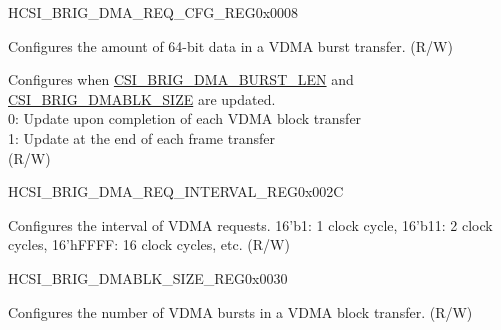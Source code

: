 \begin{register}{H}{CSI\_BRIG\_DMA\_REQ\_CFG\_REG}{0x0008}\label{regdesc:CSIBRIGDMAREQCFGREG}
%
%
%
\regnewline%
\begin{regdesc}\begin{reglist}
\label{fielddesc:CSIBRIGDMABURSTLEN}\item [CSI\_BRIG\_DMA\_BURST\_LEN] Configures the amount of 64-bit data in a VDMA burst transfer. (R/W)
\label{fielddesc:CSIBRIGDMACFGUPDBYBLK}\item [CSI\_BRIG\_DMA\_CFG\_UPD\_BY\_BLK] Configures when \hyperref[fielddesc:CSIBRIGDMABURSTLEN]{CSI\_BRIG\_DMA\_BURST\_LEN} and \hyperref[fielddesc:CSIBRIGDMABLKSIZE]{CSI\_BRIG\_DMABLK\_SIZE} are updated.\\0: Update upon completion of each VDMA block transfer\\1: Update at the end of each frame transfer\\(R/W)
\end{reglist}\end{regdesc}
\end{register}


\begin{register}{H}{CSI\_BRIG\_DMA\_REQ\_INTERVAL\_REG}{0x002C}\label{regdesc:CSIBRIGDMAREQINTERVALREG}
%
%
\regnewline%
\begin{regdesc}\begin{reglist}
\label{fielddesc:CSIBRIGDMAREQINTERVAL}\item [CSI\_BRIG\_DMA\_REQ\_INTERVAL] Configures the interval of VDMA requests. 16'b1: 1 clock cycle, 16'b11: 2 clock cycles, 16'hFFFF: 16 clock cycles, etc. (R/W)
\end{reglist}\end{regdesc}
\end{register}


\begin{register}{H}{CSI\_BRIG\_DMABLK\_SIZE\_REG}{0x0030}\label{regdesc:CSIBRIGDMABLKSIZEREG}
%
%
\regnewline%
\begin{regdesc}\begin{reglist}
\label{fielddesc:CSIBRIGDMABLKSIZE}\item [CSI\_BRIG\_DMABLK\_SIZE] Configures the number of VDMA bursts in a VDMA block transfer. (R/W)
\end{reglist}\end{regdesc}
\end{register}


